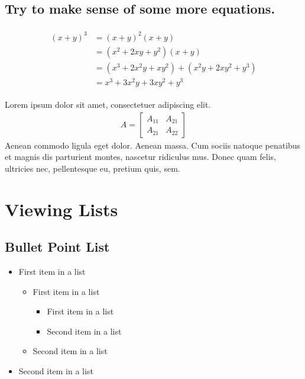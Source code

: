 \documentclass[11pt]{scrartcl} %
\begin{document}

\subsection{Try to make sense of some more equations.}

\begin{align} 
	\begin{split}
		(x+y)^3 &= (x+y)^2(x+y)\\
		&=(x^2+2xy+y^2)(x+y)\\
		&=(x^3+2x^2y+xy^2) + (x^2y+2xy^2+y^3)\\
		&=x^3+3x^2y+3xy^2+y^3
	\end{split}					
\end{align}

Lorem ipsum dolor sit amet, consectetuer adipiscing elit. 
\begin{align}
	A = 
	\begin{bmatrix}
		A_{11} & A_{21} \\
		A_{21} & A_{22}
	\end{bmatrix}
\end{align}
Aenean commodo ligula eget dolor. Aenean massa. Cum sociis natoque penatibus et magnis dis parturient montes, nascetur ridiculus mus. Donec quam felis, ultricies nec, pellentesque eu, pretium quis, sem.


\section{Viewing Lists}

\subsection{Bullet Point List}

\begin{itemize}
	\item First item in a list 
		\begin{itemize}
		\item First item in a list 
			\begin{itemize}
			\item First item in a list 
			\item Second item in a list 
			\end{itemize}
		\item Second item in a list 
		\end{itemize}
	\item Second item in a list 
\end{itemize}
\end{document}
